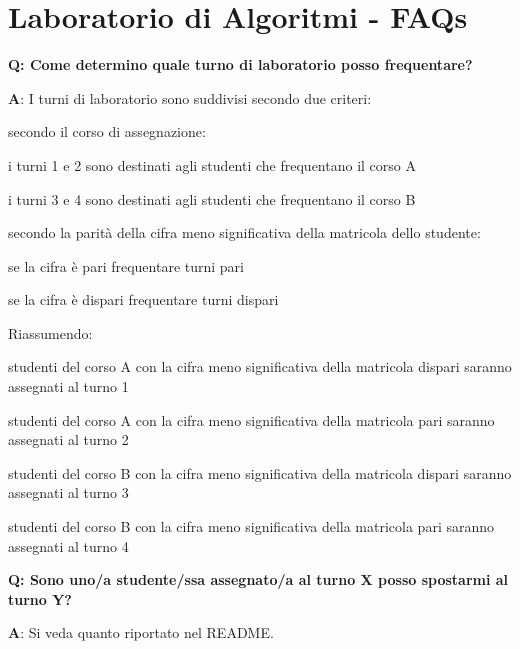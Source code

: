 \chapter{Laboratorio di Algoritmi -\/ FAQs}
\hypertarget{md_FAQ}{}\label{md_FAQ}
\label{md_FAQ_autotoc_md0}%
%
 {\bfseries{Q\+: Come determino quale turno di laboratorio posso frequentare?}}

{\bfseries{A}}\+: I turni di laboratorio sono suddivisi secondo due criteri\+:


\begin{DoxyEnumerate}
\item secondo il corso di assegnazione\+:
\begin{DoxyItemize}
\item i turni 1 e 2 sono destinati agli studenti che frequentano il corso A
\item i turni 3 e 4 sono destinati agli studenti che frequentano il corso B
\end{DoxyItemize}
\item secondo la parità della cifra meno significativa della matricola dello studente\+:
\begin{DoxyItemize}
\item se la cifra è pari frequentare turni pari
\item se la cifra è dispari frequentare turni dispari
\end{DoxyItemize}
\end{DoxyEnumerate}

Riassumendo\+:
\begin{DoxyItemize}
\item studenti del corso A con la cifra meno significativa della matricola dispari saranno assegnati al turno 1
\item studenti del corso A con la cifra meno significativa della matricola pari saranno assegnati al turno 2
\item studenti del corso B con la cifra meno significativa della matricola dispari saranno assegnati al turno 3
\item studenti del corso B con la cifra meno significativa della matricola pari saranno assegnati al turno 4
\end{DoxyItemize}

{\bfseries{Q\+: Sono uno/a studente/ssa assegnato/a al turno X posso spostarmi al turno Y?}}

{\bfseries{A}}\+: Si veda quanto riportato nel README.

